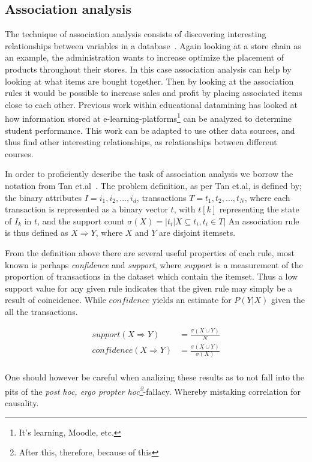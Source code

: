 \subsection{Association analysis}
	The technique of association analysis consists of discovering interesting relationships between variables
	in a database~\cite{Piateski:1991:assocrules,tan:2006:datamining,Agrawal:1993:assocrules}.
	Again looking at a store chain as an example, the administration wants to increase optimize the placement of products throughout their stores. 
	In this case association analysis can help by looking at what items are bought together. 
	Then by looking at the association rules it would be possible to increase sales and profit by placing associated items close to each other.
	Previous work within educational datamining has looked at how information stored at e-learning-platforms\footnote{It's learning, Moodle, etc.}
	can be analyzed to determine student performance\cite{merceron2008interestingness}. 
	This work can be adapted to use other data sources, and thus find other interesting relationships,
	as relationships between different courses.  
		
	\bigskip\noindent
	In order to proficiently describe the task of association analysis we borrow the notation from Tan et.al~\cite{tan:2006:datamining}.
	The problem definition, as per Tan et.al, is defined by; 
	the binary attributes $I = i_1, i_2, \ldots, i_d$, 
	transactions $T = t_1, t_2,\ldots, t_N$, where each transaction	is represented as a binary vector $t$, with $t[k]$ representing the state of $I_k$ in $t$, and the support count $\sigma (X) = |{t_i|X\subseteq t_i, t_i \in T}|$
	An association rule is thus defined as $X \Rightarrow Y$, where $X$ and $Y$ are disjoint itemsets.
	
	\bigskip\noindent
	From the definition above there are several useful properties of each rule, most known is perhaps \textit{confidence} and \textit{support},
	where $support$ is a measurement of the proportion of transactions in the dataset which contain the itemset. 
	Thus a low support value for any given rule indicates that the given rule may simply be a result of coincidence. 
	While $confidence$ yields an estimate for $P(Y|X)$ given the all the transactions.
	\begin{figure}[H]
		\begin{align}
			support(X\Rightarrow Y) &= \frac{\sigma (X \cup Y)}{N}\nonumber\\
			confidence(X\Rightarrow Y) &= \frac{\sigma (X \cup Y)}{\sigma (X)}\nonumber\\
		\end{align}
	\end{figure}
	
	\bigskip\noindent
	One should however be careful when analizing these results as to not fall into the pits of the \textit{post hoc, ergo propter hoc\footnote{After this, therefore, because of this}}-fallacy\cite{posthoc}. Whereby mistaking correlation for causality.
	
	